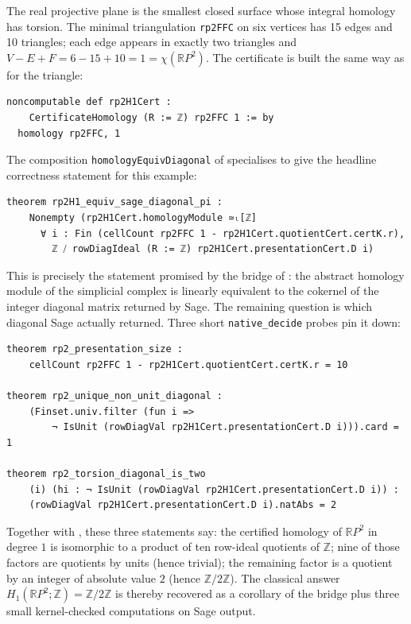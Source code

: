 \documentclass[11pt]{article}
\theoremstyle{plain}
\theoremstyle{definition}
\theoremstyle{remark}
\newcommand{\lean}[1]{\lstinline[language=lean]|#1|}
\begin{document}
The real projective plane is the smallest closed surface whose integral
homology has torsion. The minimal triangulation
\lean{rp2FFC} on six vertices has 15 edges and 10 triangles; each edge
appears in exactly two triangles and \(V-E+F = 6-15+10 = 1 = \chi(\mathbb{R}P^2)\).
The certificate is built the same way as for the triangle:

\begin{lstlisting}[caption={$\mathbb{R}P^2$ $H_1$ certificate (Sage-backed).},label={lst:rp2-cert}]
noncomputable def rp2H1Cert :
    CertificateHomology (R := ℤ) rp2FFC 1 := by
  homology rp2FFC, 1
\end{lstlisting}

The composition \texttt{homologyEquivDiagonal} of 
specialises to give the headline correctness statement for this example:

\begin{lstlisting}[caption={$\mathbb{R}P^2$: certified homology equals the cokernel of the Sage diagonal.},label={lst:rp2-bridge}]
theorem rp2H1_equiv_sage_diagonal_pi :
    Nonempty (rp2H1Cert.homologyModule ≃ₗ[ℤ]
      ∀ i : Fin (cellCount rp2FFC 1 - rp2H1Cert.quotientCert.certK.r),
        ℤ ⧸ rowDiagIdeal (R := ℤ) rp2H1Cert.presentationCert.D i)
\end{lstlisting}

This is precisely the statement promised by the bridge of
: the abstract homology module of the simplicial
complex is linearly equivalent to the cokernel of the integer diagonal
matrix returned by Sage. The remaining question is which diagonal Sage
actually returned. Three short \texttt{native\_decide} probes pin it
down:

\begin{lstlisting}[caption={Structural facts about the certified Smith diagonal for $\mathbb{R}P^2$.},label={lst:rp2-torsion-structure}]
theorem rp2_presentation_size :
    cellCount rp2FFC 1 - rp2H1Cert.quotientCert.certK.r = 10

theorem rp2_unique_non_unit_diagonal :
    (Finset.univ.filter (fun i =>
        ¬ IsUnit (rowDiagVal rp2H1Cert.presentationCert.D i))).card = 1

theorem rp2_torsion_diagonal_is_two
    (i) (hi : ¬ IsUnit (rowDiagVal rp2H1Cert.presentationCert.D i)) :
    (rowDiagVal rp2H1Cert.presentationCert.D i).natAbs = 2
\end{lstlisting}

Together with , these three statements say: the
certified homology of \(\mathbb{R}P^2\) in degree \(1\) is isomorphic to a
product of ten row-ideal quotients of \(\mathbb{Z}\); nine of those
factors are quotients by units (hence trivial); the remaining factor is a
quotient by an integer of absolute value \(2\) (hence \(\mathbb{Z}/2\mathbb{Z}\)).
The classical answer \(H_1(\mathbb{R}P^2;\mathbb{Z})=\mathbb{Z}/2\mathbb{Z}\)
is thereby recovered as a corollary of the bridge plus three small
kernel-checked computations on Sage output.
\end{document}
